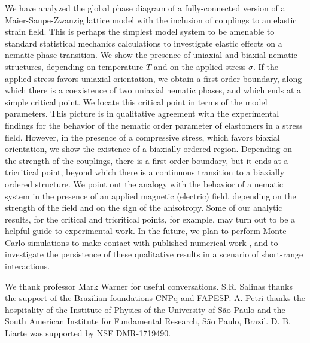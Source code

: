 \documentclass[aps,pre,reprint,amsmath,amssymbols,superscriptaddress,
nofootinbib]{revtex4-1}
\begin{document}
We have analyzed the global phase diagram of a fully-connected version of a
Maier-Saupe-Zwanzig lattice model with the inclusion of couplings to an
elastic strain field. This is perhaps the simplest model system to be amenable
to standard statistical mechanics calculations to investigate elastic effects
on a nematic phase transition. We show the presence of uniaxial and biaxial
nematic structures, depending on temperature $T$ and on the applied stress
$\sigma$. If the applied stress favors uniaxial orientation, we obtain a
first-order boundary, along which there is a coexistence of two uniaxial
nematic phases, and which ends at a simple critical point. We locate this
critical point in terms of the model parameters. This picture is in
qualitative agreement with the experimental findings for the behavior of the
nematic order parameter of elastomers in a stress field. However, in the
presence of a compressive stress, which favors biaxial orientation, we show
the existence of a biaxially ordered region. Depending on the strength of the
couplings, there is a first-order boundary, but it ends at a tricritical
point, beyond which there is a continuous transition to a biaxially ordered
structure. We point out the analogy with the behavior of a nematic system in
the presence of an applied magnetic (electric) field, depending on the
strength of the field and on the sign of the anisotropy. Some of our analytic
results, for the critical and tricritical points, for example, may turn out to
be a helpful guide to experimental work. In the future, we plan to perform
Monte Carlo simulations to make contact with published numerical work
\cite{Pasini2005}, and to investigate the persistence of these qualitative
results in a scenario of short-range interactions.

\acknowledgments

We thank professor Mark Warner for useful conversations. S.R. Salinas
thanks the support of the Brazilian foundations CNPq and FAPESP. A. Petri
thanks the hospitality of the Institute of Physics of the University of S\~ao Paulo
and the South American Institute for Fundamental Research, S\~ao Paulo,
Brazil. D. B. Liarte was supported by NSF DMR-1719490.
\end{document}
